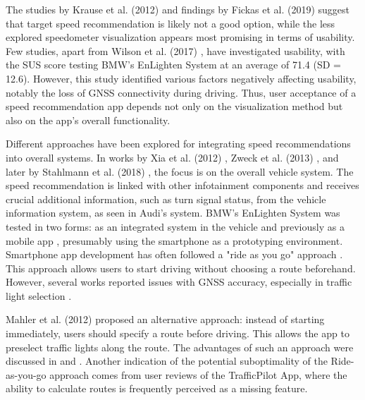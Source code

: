 The studies by Krause et al. (2012) \cite{krause_traffic_2012} and findings by Fickas et al. (2019) \cite{fickas_fast_2019} suggest that target speed recommendation is likely not a good option, while the less explored speedometer visualization appears most promising in terms of usability. Few studies, apart from Wilson et al. (2017) \cite{wilson_driver_2017}, have investigated usability, with the SUS score testing BMW's EnLighten System at an average of 71.4 (SD = 12.6). However, this study identified various factors negatively affecting usability, notably the loss of GNSS connectivity during driving. Thus, user acceptance of a speed recommendation app depends not only on the visualization method but also on the app's overall functionality.

Different approaches have been explored for integrating speed recommendations into overall systems. In works by Xia et al. (2012) \cite{xia_field_2012}, Zweck et al. (2013) \cite{zweck_traffic_2013}, and later by Stahlmann et al. (2018) \cite{stahlmann_exploring_2018}, the focus is on the overall vehicle system. The speed recommendation is linked with other infotainment components and receives crucial additional information, such as turn signal status, from the vehicle information system, as seen in Audi's system. BMW's EnLighten System was tested in two forms: as an integrated system in the vehicle \cite{sokolov_effects_2018} and previously as a mobile app \cite{wilson_driver_2017}, presumably using the smartphone as a prototyping environment. Smartphone app development has often followed a "ride as you go" approach \cite{otto_operating_2010, koukoumidis_signalguru_2011, koukoumidis_leveraging_2012, bernais_design_2016, wilson_driver_2017, zhang_green_2020, khan_eco-drive_2021, yunex_traffic_v2x-kommunikation_2023}. This approach allows users to start driving without choosing a route beforehand. However, several works reported issues with GNSS accuracy, especially in traffic light selection \cite{wilson_driver_2017, stahlmann_exploring_2018, bhattacharyya_assessing_2022}.

Mahler et al. (2012) \cite{mahler_reducing_2012} proposed an alternative approach: instead of starting immediately, users should specify a route before driving. This allows the app to preselect traffic lights along the route. The advantages of such an approach were discussed in  and . Another indication of the potential suboptimality of the Ride-as-you-go approach comes from user reviews of the TrafficPilot App, where the ability to calculate routes is frequently perceived as a missing feature.


